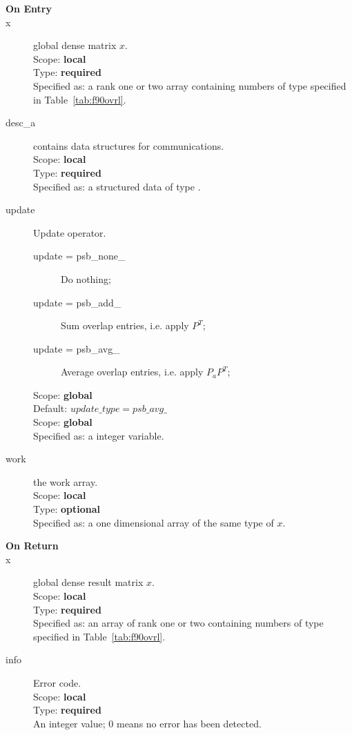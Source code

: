 \begin{description}
\item[\bf On Entry]
\item[x] global dense matrix $x$.\\
Scope: {\bf local} \\
Type: {\bf required} \\
Specified as:  a rank one or two array 
containing numbers of type specified in
Table~\ref{tab:f90ovrl}.
\item[desc\_a] contains data structures for communications.\\
Scope: {\bf local} \\
Type: {\bf required}\\
Specified as: a structured data of type \descdata.
\item[update] Update operator. \\
\begin{description}
\item[update = psb\_none\_] Do nothing;
\item[update = psb\_add\_] Sum overlap entries, i.e. apply $P^T$;
\item[update = psb\_avg\_] Average overlap entries, i.e. apply $P_aP^T$;
\end{description}
Scope: {\bf global} \\
Default: $update\_type = psb\_avg\_ $\\	
Scope: {\bf global} \\
Specified as: a integer variable.
\item[work] the work array. \\
Scope: {\bf local} \\
Type: {\bf optional}\\
Specified as: a one dimensional array of the same type of $x$.

\item[\bf On Return] 
\item[x] global dense result matrix $x$.\\
Scope: {\bf local} \\
Type: {\bf required} \\
Specified as: an  array of rank one or two
containing numbers of type specified in
Table~\ref{tab:f90ovrl}.
\item[info] Error code.\\
Scope: {\bf local} \\
Type: {\bf required} \\
An integer value; 0 means no error has been detected. 
\end{description}


